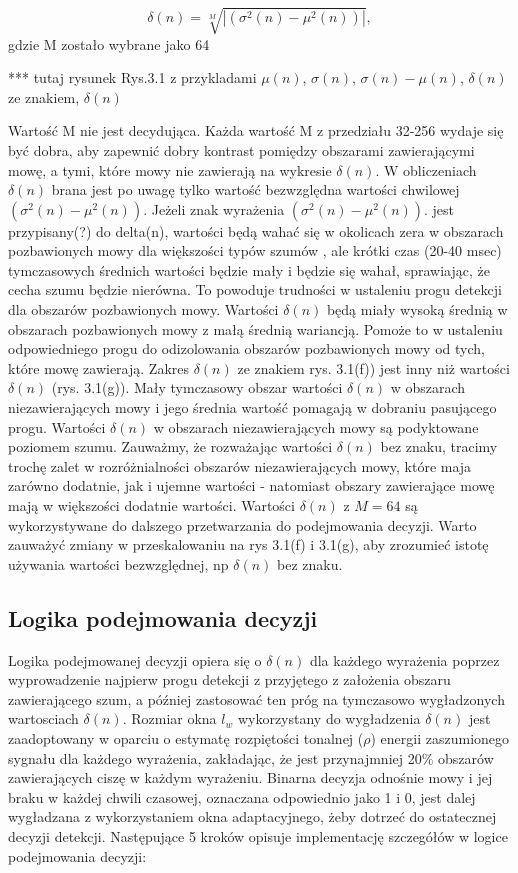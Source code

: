 \documentclass[eng,printmode]{mgr}
\begin{document}
   $$\delta(n) =\sqrt[M]{|{(\sigma^2(n) - \mu^2(n))}|},$$ gdzie M zostało wybrane jako 64
   
   *** tutaj rysunek Rys.3.1 z przykladami $\mu(n)$, $\sigma(n)$, $\sigma(n)- \mu(n)$, $\delta(n)$ ze znakiem, $\delta(n)$
   
    Wartość M nie jest decydująca. Każda wartość M z przedziału 32-256 wydaje się być dobra, aby zapewnić dobry kontrast pomiędzy obszarami zawierającymi mowę, a tymi, które mowy nie zawierają na wykresie $\delta(n)$. W obliczeniach $\delta(n)$ brana jest po uwagę tylko wartość bezwzględna wartości chwilowej $(\sigma^2(n) - \mu^2(n))$. Jeżeli znak wyrażenia $(\sigma^2(n) - \mu^2(n))$. jest przypisany(?) do delta(n), wartości będą wahać się w okolicach zera w obszarach pozbawionych mowy dla większości typów szumów , ale krótki czas (20-40 msec) tymczasowych średnich wartości będzie mały i będzie się wahał, sprawiając, że cecha szumu będzie nierówna. To powoduje trudności w ustaleniu progu detekcji dla obszarów pozbawionych mowy. Wartości $\delta(n)$ będą miały wysoką średnią w obszarach pozbawionych mowy z małą średnią wariancją. Pomoże to w ustaleniu odpowiedniego progu do odizolowania obszarów pozbawionych mowy od tych, które mowę zawierają. Zakres $\delta(n)$ ze znakiem rys. 3.1(f)) jest inny niż wartości $\delta(n)$ (rys. 3.1(g)). Mały tymczasowy obszar wartości $\delta(n)$ w obszarach niezawierających  mowy i jego średnia wartość pomagają w dobraniu pasującego progu. Wartości $\delta(n)$ w obszarach niezawierających mowy są podyktowane poziomem szumu. Zauważmy, że rozważając wartości  $\delta(n)$ bez znaku, tracimy trochę zalet w rozróżnialności obszarów niezawierających mowy, które maja zarówno dodatnie, jak i ujemne wartości - natomiast obszary zawierające mowę mają w większości dodatnie wartości. Wartości $\delta(n)$ z $M=64$ są wykorzystywane do dalszego przetwarzania do podejmowania decyzji. Warto zauważyć zmiany w przeskalowaniu na rys 3.1(f) i 3.1(g), aby zrozumieć istotę używania wartości bezwzględnej, np $\delta(n)$ bez znaku.
    
  \subsection{Logika podejmowania decyzji}
  Logika podejmowanej decyzji opiera się o $\delta(n)$ dla każdego wyrażenia poprzez wyprowadzenie najpierw progu detekcji z przyjętego z założenia obszaru zawierającego szum, a później zastosować ten próg na tymczasowo wygładzonych wartosciach $\delta(n)$. Rozmiar okna $l_{w}$ wykorzystany do wygładzenia $\delta(n)$ jest zaadoptowany w oparciu o estymatę rozpiętości tonalnej ($\rho$) energii zaszumionego sygnału dla każdego wyrażenia, zakładając, że jest przynajmniej 20\% obszarów zawierających ciszę w każdym wyrażeniu. Binarna decyzja odnośnie mowy i jej braku w każdej chwili czasowej, oznaczana odpowiednio jako 1 i 0, jest dalej wygładzana z wykorzystaniem okna adaptacyjnego, żeby dotrzeć do ostatecznej decyzji detekcji. Następujące 5 kroków opisuje implementację szczegółów w logice podejmowania decyzji:\vspace{5mm}
  
\end{document}
